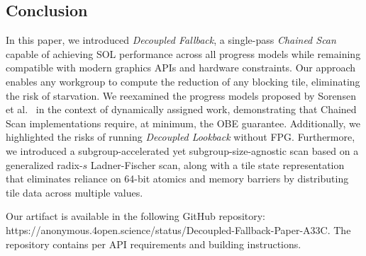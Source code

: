 \documentclass[acmsmall, manuscript, screen, review, anonymous]{acmart}
\begin{document}
\subsection{Conclusion}
In this paper, we introduced \emph{Decoupled Fallback}, a single-pass \emph{Chained Scan} capable of achieving SOL performance across all progress models while remaining compatible with modern graphics APIs and hardware constraints. Our approach enables any workgroup to compute the reduction of any blocking tile, eliminating the risk of starvation. We reexamined the progress models proposed by Sorensen et al.~\cite{sorensen2021} in the context of dynamically assigned work, demonstrating that Chained Scan implementations require, at minimum, the OBE guarantee. Additionally, we highlighted the risks of running \emph{Decoupled Lookback} without FPG. Furthermore, we introduced a subgroup-accelerated yet subgroup-size-agnostic scan based on a generalized radix-$s$ Ladner-Fischer scan, along with a tile state representation that eliminates reliance on 64-bit atomics and memory barriers by distributing tile data across multiple values.

Our artifact is available in the following GitHub repository: https://anonymous.4open.science/status/Decoupled-Fallback-Paper-A33C. The repository contains per API requirements and building instructions.



\end{document}
